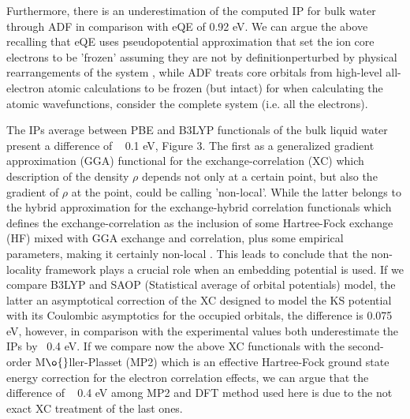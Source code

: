 \documentclass[12pt,a4paper]{article}
\begin{document}
Furthermore, there is an underestimation of the computed IP for bulk water through ADF in comparison with eQE of 0.92 eV. We can argue the above
recalling that eQE uses pseudopotential approximation that set the ion core electrons to be 'frozen' assuming they are not by definitionperturbed
by physical rearrangements of the system \cite{srivastava1987theory}, while ADF treats core orbitals from high-level all-electron atomic calculations
to be frozen (but intact) for when calculating the atomic wavefunctions, consider the complete system (i.e. all the electrons)\cite{te2001chemistry}.

The IPs average between PBE and B3LYP functionals of the bulk liquid water present a difference of ~ 0.1 eV, Figure 3. The first as a generalized
gradient approximation (GGA) functional for the exchange-correlation (XC) which description of the density $\rho$ depends not only 
at a certain point, but also the gradient of $\rho$  at the point, could be calling 'non-local'\cite{perdew1996phys}. While the latter belongs
to the hybrid approximation for the exchange-hybrid correlation functionals which defines the exchange-correlation as the inclusion of some
Hartree-Fock exchange (HF) mixed with GGA exchange and correlation, plus some empirical parameters, making it certainly non-local
\cite{hertwig1997parameterization}. This leads to conclude that the non-locality framework plays a crucial role when an embedding potential is used. 
If we compare B3LYP and SAOP (Statistical average of orbital potentials) model, the latter an asymptotical correction of the XC designed to model
the KS potential with its Coulombic asymptotics for the occupied orbitals\cite{chong2002interpretation, van2014physical}, the difference is 0.075
eV, however, in comparison with the experimental values both underestimate the IPs by ~0.4 eV. If we compare now the above XC functionals with
the second-order M$\o{}$ller-Plasset (MP2) which is an effective Hartree-Fock ground state energy correction for the electron correlation effects, 
\cite{del2012second} we can argue that the difference of ~ 0.4 eV among MP2 and DFT method used here is due to the not exact XC treatment of
the last ones.
\end{document}
